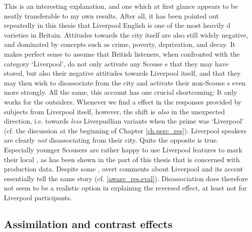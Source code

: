 This is an interesting explanation, and one which at first glance appears to be neatly transferable to my own results.
After all, it has been pointed out repeatedly in this thesis that Liverpool English is one of the most heavily d varieties in Britain.
Attitudes towards the city itself are also still widely negative, and dominated by concepts such as crime, poverty, deprivation, and decay.
It makes perfect sense to assume that British listeners, when confronted with the category `Liverpool', do not only activate any Scouse s that they may have stored, but also their negative attitudes towards Liverpool itself, and that they may then wish to disassociate from the city and activate their non-Scouse s even more strongly.
All the same, this account has one crucial shortcoming: It only works for the outsiders.
Whenever we find a  effect in the responses provided by subjects from Liverpool itself, however, the shift is \emph{also} in the unexpected direction, i.e. towards \emph{less} Liverpudlian variants when the prime was `Liverpool' (cf. the discussion at the beginning of Chapter \ref{ch.perc_res}).
Liverpool speakers are clearly \emph{not} disassociating from their city.
Quite the opposite is true.
Especially younger Scousers are rather happy to use Liverpool features to mark their local , as has been shown in the part of this thesis that is concerned with production data.
Despite some , overt comments about Liverpool and its accent essentially tell the same story (cf. \ref{aware_res.eval}).
Disassociation does therefore not seem to be a realistic option in explaining the reversed  effect, at least not for Liverpool participants.

		\subsection{Assimilation and contrast effects}

